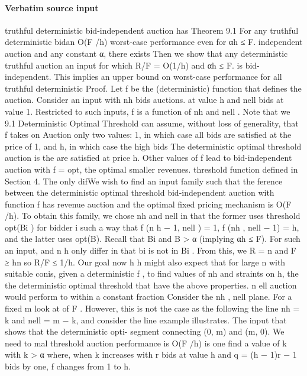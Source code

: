 \documentclass[10pt]{article}
\begin{document}
\paragraph{Verbatim source input}
\begin{ReviewVerbatim}
truthful deterministic bid-independent auction has Theorem 9.1 For any truthful deterministic bidan O(F /h) worst-case performance even for αh ≤ F. independent auction and any constant α, there exists
Then we show that any deterministic truthful auction an input for which R/F = O(1/h) and αh ≤ F.
is bid-independent. This implies an upper bound on
worst-case performance for all truthful deterministic Proof. Let f be the (deterministic) function that
defines the auction. Consider an input with nh bids
auctions.
at value h and nell bids at value 1. Restricted to such
inputs, f is a function of nh and nell . Note that we
9.1 Deterministic Optimal Threshold can assume, without loss of generality, that f takes on
Auction
only two values: 1, in which case all bids are satisfied
at the price of 1, and h, in which case the high bids
The deterministic optimal threshold auction is the
are satisfied at price h. Other values of f lead to
bid-independent auction with f = opt, the optimal
smaller revenues.
threshold function defined in Section 4. The only difWe wish to find an input family such that the
ference between the deterministic optimal threshold
bid-independent
auction with function f has revenue
auction and the optimal fixed pricing mechanism is
O(F
/h).
To
obtain
this family, we chose nh and nell in
that the former uses threshold opt(Bi ) for bidder i
such
a
way
that
f
(n
h − 1, nell ) = 1, f (nh , nell − 1) = h,
and the latter uses opt(B). Recall that Bi and B
>
α
(implying
αh ≤ F). For such an input,
and
n
h
only differ in that bi is not in Bi . From this, we
R
=
n
and
F
≥
hn
so
R/F ≤ 1/h. Our goal now
h
h
might also expect that for large n with suitable conis,
given
a
deterministic
f
, to find values of nh and
straints on h, the the deterministic optimal threshold
that
have
the
above
properties.
n
ell
auction would perform to within a constant fraction
Consider the nh , nell plane. For a fixed m look at
of F . However, this is not the case as the following
the line nh = k and nell = m − k, and consider the line
example illustrates.
The input that shows that the deterministic opti- segment connecting (0, m) and (m, 0). We need to
mal threshold auction performance is O(F /h) is one find a value of k with k > α where, when k increases
with r bids at value h and q = (h − 1)r − 1 bids by one, f changes from 1 to h.

\end{ReviewVerbatim}
\end{document}
